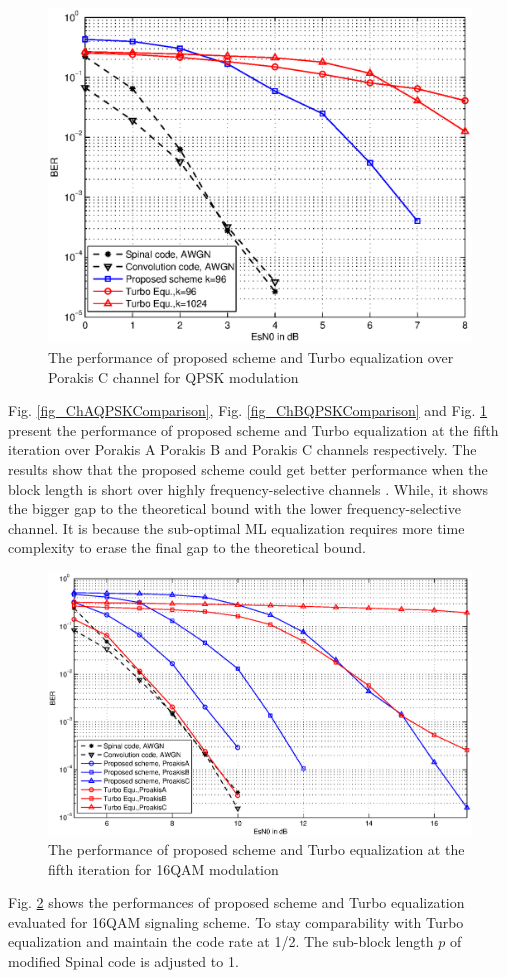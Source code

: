 \documentclass[conference]{IEEEtran}
\begin{document}
\begin{figure}[!t]
\centering
\includegraphics[width=3.1 in]{ChCQPSKComparison.eps}
\caption{The performance of proposed scheme and Turbo equalization over Porakis C channel for QPSK modulation}
\label{fig_ChCQPSKComparison}
\end{figure}
Fig. \ref{fig_ChAQPSKComparison}, Fig. \ref{fig_ChBQPSKComparison} and Fig. \ref{fig_ChCQPSKComparison}  present the performance of proposed scheme and Turbo equalization at the fifth iteration over Porakis A Porakis B and Porakis C channels respectively.  The results show that the proposed scheme could get better performance when the block length is short over highly frequency-selective channels . While, it shows the bigger gap to the theoretical bound with the lower frequency-selective channel. It is because the sub-optimal ML equalization requires more time complexity to erase the final gap to the theoretical bound.
\begin{figure}[!t]
\centering
\includegraphics[width=3.5 in]{16QAMComparison.eps}
\caption{The performance of proposed scheme and Turbo equalization at the fifth iteration for 16QAM modulation}
\label{fig_16QAMComparison}
\end{figure}
Fig. \ref{fig_16QAMComparison} shows the performances of proposed scheme and Turbo equalization evaluated for 16QAM signaling scheme. To stay comparability with Turbo equalization and maintain the code rate at 1/2. The sub-block length $p$ of modified Spinal code is adjusted to 1. 
\end{document}
